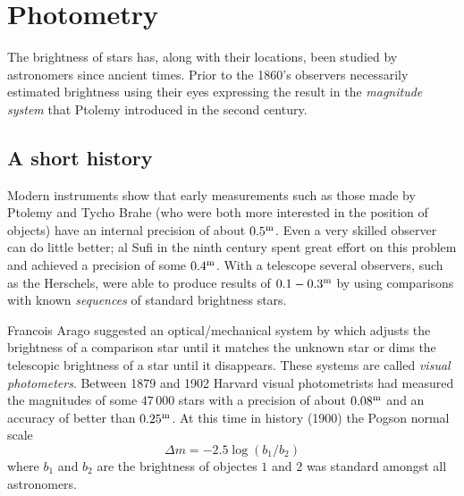 %
\setcounter{count}{\value{enumi}}
\section{Photometry}

The brightness of stars has, along with their locations, been studied
by astronomers since ancient times. Prior to the 1860's observers
necessarily estimated brightness using their eyes expressing the
result in the {\it magnitude system} that Ptolemy introduced in the
second century. 

\subsection{A short history}

Modern instruments show that early measurements such as those made by
Ptolemy and Tycho Brahe (who were both more interested in the position
of objects) have an internal precision of about $0.5^{\rm m}$. Even a
very skilled observer can do little better; al Sufi in the ninth
century spent great effort on this problem and achieved a precision of
some $0.4^{\rm m}$. With a telescope several observers, such as the Herschels, were able to
produce results of $0.1-0.3^{\rm m}$ by using comparisons with known
{\it sequences} of standard brightness stars. 

Francois Arago suggested an optical/mechanical system by which adjusts
the brightness of a comparison star until it matches the unknown star
or dims the telescopic brightness of a star until it disappears. These
systems are called  {\it visual photometers}. Between 1879 and 1902
Harvard visual photometrists had measured the magnitudes of some
$47\,000$ stars with a precision of about $0.08^{\rm m}$ and an
accuracy of better than $0.25^{\rm m}$. At this time in history (1900)
the Pogson normal scale
\[
\Delta m=-2.5\log({b_1/b_2})
\]
where $b_1$ and $b_2$ are the brightness of objectes $1$ and $2$ was
standard amongst all astronomers. 

